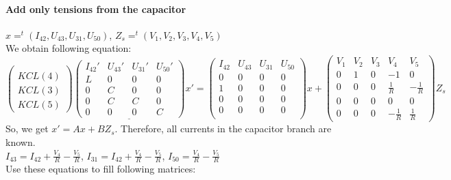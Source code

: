 \documentclass[10pt]{article}
\begin{document}
\paragraph{Add only tensions from the capacitor}
$x=^{t}(I_{42},U_{43},U_{31},U_{50})$,
$Z_{s}=^{t}(V_{1},V_{2},V_{3},V_{4},V_{5})$\\
We obtain following equation:
\[
\left(\begin{array}{c}
  \\  KCL(4)\\  KCL(3)\\  KCL(5)
\end{array}\right)
\underline{
\left(\begin{array}{cccc}
  I_{42}'&U_{43}'&U_{31}'&U_{50}'\\
  \hline
L&0&0&0\\
0&C&0&0\\
0&C&C&0\\
0&0&0&C
\end{array}\right)}x'=
\left(\begin{array}{cccc}
  I_{42}&U_{43}&U_{31}&U_{50}\\
  \hline
0&0&0&0\\
1&0&0&0\\
0&0&0&0\\
0&0&0&0\\ 
\end{array}\right)x+
\left(\begin{array}{ccccc}
V_{1}&V_{2}&V_{3}&V_{4}&V_{5}\\
  \hline
  0&1&0&-1&0\\
  0&0&0&\frac{1}{R}&-\frac{1}{R}\\
  0&0&0&0&0\\
  0&0&0&-\frac{1}{R}&\frac{1}{R}
\end{array}\right)Z_{s}
\]
So, we get $x'=Ax+BZ_{s}$. Therefore, all currents in the capacitor branch are known.\\
$I_{43}= I_{42}+\frac{V_{4}}{R}-\frac{V_{5}}{R}$,
$I_{31}= I_{42}+\frac{V_{4}}{R}-\frac{V_{5}}{R}$,
$I_{50}= \frac{V_{4}}{R}-\frac{V_{5}}{R}$\\
Use these equations to fill following matrices:
\end{document}
